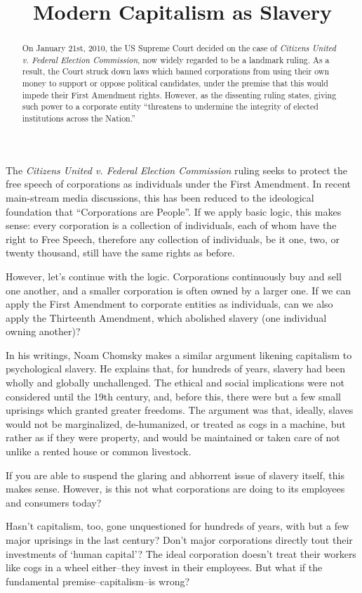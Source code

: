 \documentclass[letterpaper]{article}
\title{Modern Capitalism as Slavery}
\date{}
\begin{document}
	\maketitle
	\onehalfspacing
    \begin{abstract}
On January 21st, 2010, the US Supreme Court decided on the case of \emph{Citizens United v. Federal Election Commission}, now widely regarded to be a landmark ruling. As a result, the Court struck down laws which banned corporations from using their own money to support or oppose political candidates, under the premise that this would impede their First Amendment rights. However, as the dissenting ruling states, giving such power to a corporate entity ``threatens to undermine the integrity of elected institutions across the Nation.''
\end{abstract}

The \emph{Citizens United v. Federal Election Commission} ruling seeks to protect the free speech of corporations as individuals under the First Amendment. In recent main-stream media discussions, this has been reduced to the ideological foundation that ``Corporations are People''. If we apply basic logic, this makes sense: every corporation is a collection of individuals, each of whom have the right to Free Speech, therefore any collection of individuals, be it one, two, or twenty thousand, still have the same rights as before. 

However, let's continue with the logic. Corporations continuously buy and sell one another, and a smaller corporation is often owned by a larger one. If we can apply the First Amendment to corporate entities as individuals, can we also apply the Thirteenth Amendment, which abolished slavery (one individual owning another)?

In his writings, Noam Chomsky makes a similar argument likening capitalism to psychological slavery. He explains that, for hundreds of years, slavery had been wholly and globally unchallenged. The ethical and social implications were not considered until the 19th century, and, before this, there were but a few small uprisings which granted greater freedoms. The argument was that, ideally, slaves would not be marginalized, de-humanized, or treated as cogs in a machine, but rather as if they were property, and would be maintained or taken care of not unlike a rented house or common livestock.

If you are able to suspend the glaring and abhorrent issue of slavery itself, this makes sense. However, is this not what corporations are doing to its employees and consumers today?

Hasn't capitalism, too, gone unquestioned for hundreds of years, with but a few major uprisings in the last century? Don't major corporations directly tout their investments of `human capital'? The ideal corporation doesn't treat their workers like cogs in a wheel either--they invest in their employees. But what if the fundamental premise--capitalism--is wrong?

   
\end{document}
